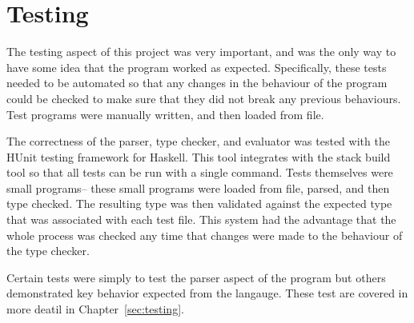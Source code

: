 \section{Testing}
The testing aspect of this project was very important, and was the only way to
have some idea that the program worked as expected. Specifically, these tests
needed to be automated so that any changes in the behaviour of the program could
be checked to make sure that they did not break any previous behaviours. Test
programs were manually written, and then loaded from file.

%
The correctness of the parser, type checker, and evaluator was tested with the
HUnit testing framework for Haskell. This tool integrates with the stack build
tool so that all tests can be run with a single command. Tests themselves were
small programs-- these small programs were loaded from file, parsed, and then
type checked. The resulting type was then validated against the expected type
that was associated with each test file. This system had the advantage that
the whole process was checked any time that changes were made to the behaviour
of the type checker.

Certain tests were simply to test the parser aspect of the program but others
demonstrated key behavior expected from the langauge. These test are covered in
more deatil in Chapter~\ref{sec:testing}.

